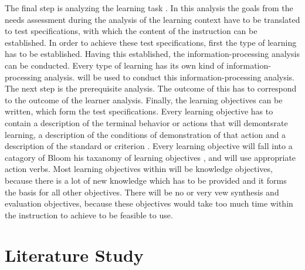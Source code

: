 \documentclass[12pt]{report} %
\begin{document}
The final step is analyzing the learning task \cite{smithragan}. In this analysis the goals from the needs assessment during the analysis of the learning context have to be translated to test specifications, with which the content of the instruction can be established. In order to achieve these test specifications, first the type of learning has to be established. Having this established, the information-processing analysis can be conducted. Every type of learning has its own kind of information-processing analysis.  will be used to conduct this information-processing analysis. The next step is the prerequisite analysis. The outcome of this has to correspond to the outcome of the learner analysis. Finally, the learning objectives can be written, which form the test specifications. Every learning objective has to contain a description of the terminal behavior or actions that will demontsrate learning, a description of the conditions of demonstration of that action and a description of the standard or criterion \cite{smithragan}. Every learning objective will fall into a catagory of Bloom his taxanomy of learning objectives \cite{bloom}, and will use appropriate action verbs. Most learning objectives within will be knowledge objectives, because there is a lot of new knowledge which has to be provided and it forms the basis for all other objectives. There will be no or very vew synthesis and evaluation objectives, because these objectives would take too much time within the instruction to achieve to be feasible to use.

\section{Literature Study}
\end{document}
